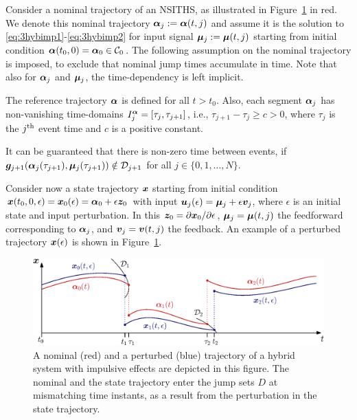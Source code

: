 \documentclass[../DC2017114Bouma.tex]{subfiles}
\begin{document}
Consider a nominal trajectory of an NSITHS, as illustrated in Figure~\ref{fig:3perturbedtraj} in red. We denote this nominal trajectory $\boldsymbol{\alpha}_j:=\boldsymbol{\alpha}(t,j)$ and assume it is the solution to \eqref{eq:3hybimp1}-\eqref{eq:3hybimp2} for input signal $\boldsymbol{\mu}_j:=\boldsymbol{\mu}(t,j)$ starting from initial condition $\boldsymbol{\alpha}(t_0,0)=\boldsymbol{\alpha}_0\in \mathcal{C}_0$. The following assumption on the nominal trajectory is imposed, to exclude that nominal jump times accumulate in time. Note that also for $\boldsymbol{\alpha}_j$ and $\boldsymbol{\mu}_j$, the time-dependency is left implicit.

\begin{sloppypar}
\begin{myass}
The reference trajectory $\boldsymbol{\alpha}$ is defined for all $t>t_0$. Also, each segment $\boldsymbol{\alpha}_j$ has non-vanishing time-domains $I^{\boldsymbol{\alpha}}_j=[\tau_j,\tau_{j+1}]$, i.e., $\tau_{j+1}-\tau_j\geq c > 0$, where $\tau_j$ is the $j^{\textnormal{th}}$ event time and $c$ is a positive constant.\label{ass:nonzeno}
\end{myass}
\end{sloppypar}

It can be guaranteed that there is non-zero time between events, if ${\boldsymbol{g}}_{j+1}(\boldsymbol{\alpha}_j(\tau_{j+1}),\boldsymbol{\mu}_j(\tau_{j+1}))\notin \mathcal{D}_{j+1}$ for all $j\in\{0,1,\dots,N\}$.

Consider now a state trajectory ${\boldsymbol{x}}$ starting from initial condition ${\boldsymbol{x}}(t_0,0,\epsilon)={\boldsymbol{x}}_0(\epsilon)=\boldsymbol{\alpha}_0+\epsilon {\boldsymbol{z}}_0$ with input ${\boldsymbol{u}}_j(\epsilon)=\boldsymbol{\mu}_j+\epsilon {\boldsymbol{v}}_j$, where $\epsilon$ is an initial state and input perturbation. In this ${\boldsymbol{z}}_0 = \partial{\boldsymbol{x}}_0 / \partial\epsilon$, $\boldsymbol{\mu}_j = \boldsymbol{\mu}(t,j)$ the feedforward corresponding to $\boldsymbol{\alpha}_j$, and ${\boldsymbol{v}}_j = {\boldsymbol{v}}(t,j)$ the feedback. An example of a perturbed trajectory ${\boldsymbol{x}}(\epsilon)$ is shown in Figure~\ref{fig:3perturbedtraj}.

%
%
\begin{figure}[bt!]
\centering
\includegraphics[width=.9\textwidth]{perturbedtraj.eps}\caption{A nominal (red) and a perturbed (blue) trajectory of a hybrid system with impulsive effects are depicted in this figure. The nominal and the state trajectory enter the jump sets $D$ at mismatching time instants, as a result from the perturbation in the state trajectory.} \label{fig:3perturbedtraj}
\end{figure}
\end{document}
